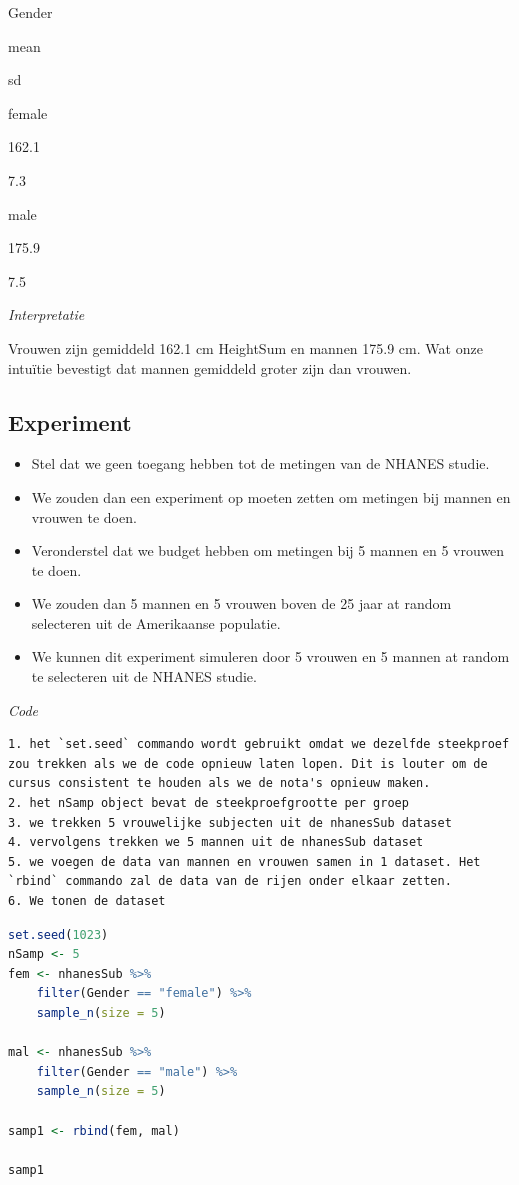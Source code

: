\documentclass[
  12pt,dutch,coursenotes]{book}
\begin{document}
Gender

mean

sd

female

162.1

7.3

male

175.9

7.5

\emph{Interpretatie}

Vrouwen zijn gemiddeld 162.1 cm HeightSum en mannen 175.9 cm.
Wat onze intuïtie bevestigt dat mannen gemiddeld groter zijn dan vrouwen.

\hypertarget{experiment}{%
\subsection{Experiment}\label{experiment}}

\begin{itemize}
\item
  Stel dat we geen toegang hebben tot de metingen van de NHANES studie.
\item
  We zouden dan een experiment op moeten zetten om metingen bij mannen en vrouwen te doen.
\item
  Veronderstel dat we budget hebben om metingen bij 5 mannen en 5 vrouwen te doen.
\item
  We zouden dan 5 mannen en 5 vrouwen boven de 25 jaar at random selecteren uit de Amerikaanse populatie.
\item
  We kunnen dit experiment simuleren door 5 vrouwen en 5 mannen at random te selecteren uit de NHANES studie.
\end{itemize}

\emph{Code}

\begin{lstlisting}
1. het `set.seed` commando wordt gebruikt omdat we dezelfde steekproef zou trekken als we de code opnieuw laten lopen. Dit is louter om de cursus consistent te houden als we de nota's opnieuw maken.
2. het nSamp object bevat de steekproefgrootte per groep
3. we trekken 5 vrouwelijke subjecten uit de nhanesSub dataset
4. vervolgens trekken we 5 mannen uit de nhanesSub dataset
5. we voegen de data van mannen en vrouwen samen in 1 dataset. Het `rbind` commando zal de data van de rijen onder elkaar zetten.
6. We tonen de dataset
\end{lstlisting}

\begin{lstlisting}[language=R]
set.seed(1023)
nSamp <- 5
fem <- nhanesSub %>%
    filter(Gender == "female") %>%
    sample_n(size = 5)

mal <- nhanesSub %>%
    filter(Gender == "male") %>%
    sample_n(size = 5)

samp1 <- rbind(fem, mal)

samp1
\end{lstlisting}
\end{document}
